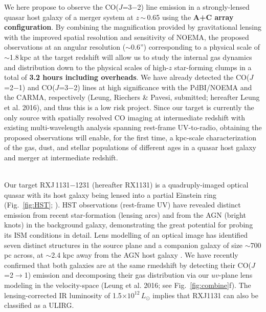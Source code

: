 \documentclass[11pt,a4paper,twoside,graphicx,color]{article}
\newcommand{\Lsun}{\mbox{$L_{\odot}$}\xspace}
\newcommand{\rarr}{$\rightarrow$}
\newcommand{\bco}{\mbox{CO($J$=2$-$1)}\xspace}
\newcommand{\cco}{\mbox{CO($J$=3$-$2)}\xspace}
\newcommand{\rot}[3][HCN]{\mbox{#1($J$=#2\rarr#3)}\xspace}
\newcommand{\Fig}[1]{Fig.~\ref{fig:#1}}
\newcommand{\E}[1]{\mbox{$\times10^{#1}$}}
\newcommand{\ssim}{\,$\sim$\,}
\newcommand{\mulw}{multi-wavelength\xspace}
\newcommand{\highz}{high-$z$\xspace}
\newcommand{\obs}{observations\xspace}
\begin{document}
We here propose to observe the \cco line emission in a strongly-lensed quasar host galaxy of a merger system at $z$\ssim0.65 using the {\bf A+C array configuration}.
By combining the magnification provided by gravitational lensing with the improved spatial resolution and sensitivity of NOEMA, 
the proposed \obs at an angular resolution ($\sim$0.6'') 
corresponding to a physical scale of $\sim$1.8\,kpc at the target redshift
will allow us to study the internal gas dynamics and distribution 
down to the physical scales of \highz star-forming clumps in a total of {\bf 3.2 hours including overheads}.
We have already detected the \bco and \cco lines at high significance with the PdBI/NOEMA and 
the CARMA, respectively (Leung, Riechers \& Pavesi, submitted; hereafter Leung et al. 2016), and thus this is a low risk project.
Since our target is currently the only source with spatially resolved CO
imaging at intermediate redshift with existing \mulw analysis spanning rest-frame
UV-to-radio, obtaining the proposed \obs will enable, for the first time, a kpc-scale characterization of the gas, dust, and stellar populations of different ages in a quasar host galaxy and merger at intermediate redshift.
\vspace{0.5em}

\\
\indent Our target RXJ\,1131$-$1231 (hereafter RX1131) is a quadruply-imaged optical quasar with its host galaxy being lensed
into a partial Einstein ring (\Fig{HST}; \citealt{Sluse03a}).
HST observations (rest-frame UV) have revealed distinct emission
from recent star-formation (lensing arcs) and from the AGN (bright knots) in the background galaxy,
demonstrating the great potential for probing its
ISM conditions in detail. Lens modelling of an optical image has identified
seven distinct structures in the source plane and a companion galaxy of
size $\sim$700 pc across, at $\sim$2.4 kpc away from the AGN host galaxy \citep{Brewer08a}.
We have recently confirmed that both galaxies are at the same rmedshift by detecting their
\rot[CO]{2}{1} emission and decomposing their gas distribution
via our $uv$-plane lens modeling in the velocity-space (Leung et al. 2016; see \Fig{combine}f).
The lensing-corrected IR luminosity of 1.5\E{12}\,\Lsun implies that RXJ1131 can also be classified 
as a ULIRG. 
\end{document}
